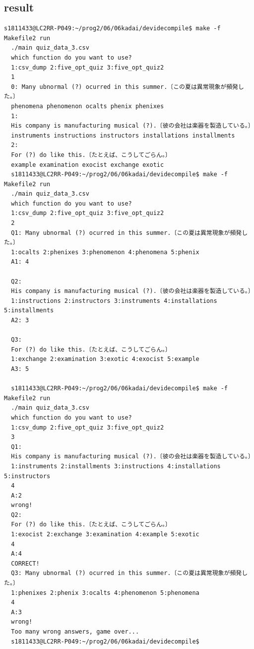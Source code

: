 \documentclass[10pt,a4paper]{jsarticle}
\begin{document}
\subsection{result}
\begin{lstlisting}[basicstyle=\ttfamily\footnotesize,frame=single,breaklines=true]s1811433@LC2RR-P049:~/prog2/06/06kadai/devidecompile$ make -f Makefile2 run
  ./main quiz_data_3.csv
  which function do you want to use?
  1:csv_dump 2:five_opt_quiz 3:five_opt_quiz2
  1
  0: Many ubnormal (?) ocurred in this summer.〔この夏は異常現象が頻発した。〕
  phenomena phenomenon ocalts phenix phenixes
  1:
  His company is manufacturing musical (?).〔彼の会社は楽器を製造している。〕
  instruments instructions instructors installations installments
  2:
  For (?) do like this.〔たとえば、こうしてごらん。〕
  example examination exocist exchange exotic
  s1811433@LC2RR-P049:~/prog2/06/06kadai/devidecompile$ make -f Makefile2 run
  ./main quiz_data_3.csv
  which function do you want to use?
  1:csv_dump 2:five_opt_quiz 3:five_opt_quiz2
  2
  Q1: Many ubnormal (?) ocurred in this summer.〔この夏は異常現象が頻発した。〕
  1:ocalts 2:phenixes 3:phenomenon 4:phenomena 5:phenix
  A1: 4

  Q2:
  His company is manufacturing musical (?).〔彼の会社は楽器を製造している。〕
  1:instructions 2:instructors 3:instruments 4:installations 5:installments
  A2: 3

  Q3:
  For (?) do like this.〔たとえば、こうしてごらん。〕
  1:exchange 2:examination 3:exotic 4:exocist 5:example
  A3: 5

  s1811433@LC2RR-P049:~/prog2/06/06kadai/devidecompile$ make -f Makefile2 run
  ./main quiz_data_3.csv
  which function do you want to use?
  1:csv_dump 2:five_opt_quiz 3:five_opt_quiz2
  3
  Q1:
  His company is manufacturing musical (?).〔彼の会社は楽器を製造している。〕
  1:instruments 2:installments 3:instructions 4:installations 5:instructors
  4
  A:2
  wrong!
  Q2:
  For (?) do like this.〔たとえば、こうしてごらん。〕
  1:exocist 2:exchange 3:examination 4:example 5:exotic
  4
  A:4
  CORRECT!
  Q3: Many ubnormal (?) ocurred in this summer.〔この夏は異常現象が頻発した。〕
  1:phenixes 2:phenix 3:ocalts 4:phenomenon 5:phenomena
  4
  A:3
  wrong!
  Too many wrong answers, game over...
  s1811433@LC2RR-P049:~/prog2/06/06kadai/devidecompile$
  
     
\end{lstlisting}
\end{document}
